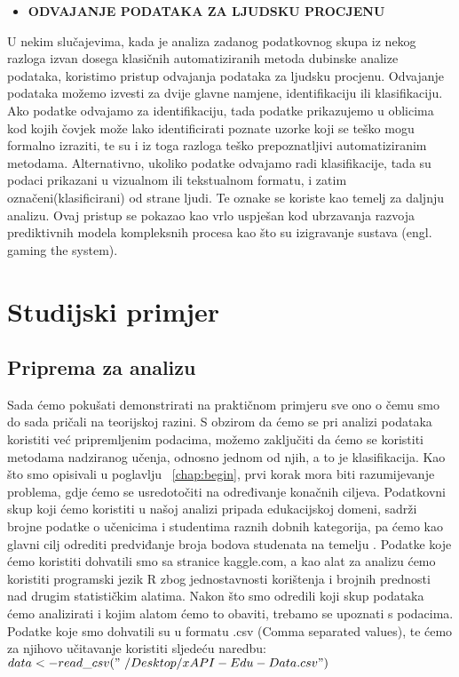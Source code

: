 \documentclass[times, utf8, zavrsni, numeric]{fer}
\begin{document}
\begin{itemize}
\item \textbf{ODVAJANJE PODATAKA ZA LJUDSKU PROCJENU}
\end{itemize}
U nekim slučajevima, kada je analiza zadanog podatkovnog skupa iz nekog razloga izvan dosega klasičnih automatiziranih metoda dubinske analize podataka, koristimo pristup odvajanja podataka za ljudsku procjenu. Odvajanje podataka možemo izvesti za dvije glavne namjene, identifikaciju ili klasifikaciju. Ako podatke odvajamo za identifikaciju, tada podatke prikazujemo u oblicima kod kojih čovjek može lako identificirati poznate uzorke koji se teško mogu formalno izraziti, te su i iz toga razloga teško prepoznatljivi automatiziranim metodama. Alternativno, ukoliko podatke odvajamo radi klasifikacije, tada su podaci prikazani u vizualnom ili tekstualnom formatu, i zatim označeni(klasificirani) od strane ljudi. Te oznake se koriste kao temelj za daljnju analizu. Ovaj pristup se pokazao kao vrlo uspješan kod ubrzavanja razvoja prediktivnih modela kompleksnih procesa kao što su izigravanje sustava (engl. gaming the system)\cite{edm2}.



\chapter{Studijski primjer}

\section{Priprema za analizu}

Sada ćemo pokušati demonstrirati na praktičnom primjeru sve ono o čemu smo do sada pričali na teorijskoj razini. S obzirom da ćemo se pri analizi podataka koristiti već pripremljenim podacima, možemo zaključiti da ćemo se koristiti metodama nadziranog učenja, odnosno jednom od njih, a to je klasifikacija. Kao što smo opisivali u poglavlju ~\ref{chap:begin}, prvi korak mora biti razumijevanje problema, gdje ćemo se usredotočiti na određivanje konačnih ciljeva. Podatkovni skup koji ćemo koristiti u našoj analizi pripada edukacijskoj domeni, sadrži brojne podatke o učenicima i studentima raznih dobnih kategorija, pa ćemo kao glavni cilj odrediti predviđanje broja bodova studenata na temelju . Podatke koje ćemo koristiti dohvatili smo sa stranice kaggle.com, a kao alat za analizu ćemo koristiti programski jezik R zbog jednostavnosti korištenja i brojnih prednosti nad drugim statističkim alatima. Nakon što smo odredili koji skup podataka ćemo analizirati i kojim alatom ćemo to obaviti, trebamo se upoznati s podacima. Podatke koje smo dohvatili su u formatu .csv (Comma separated values), te ćemo za njihovo učitavanje koristiti sljedeću naredbu: $data<-read\_csv("~/Desktop/xAPI-Edu-Data.csv")$
\end{document}
